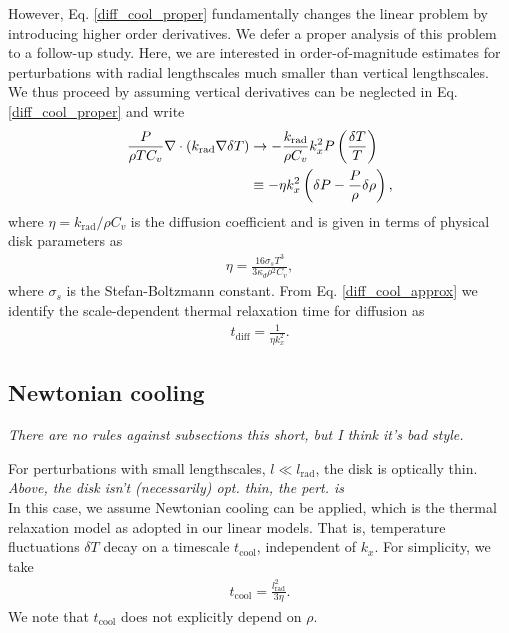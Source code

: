 However, Eq. \ref{diff_cool_proper} fundamentally changes the linear
problem by introducing higher order derivatives. We defer a proper
analysis of this problem to a follow-up study. Here, we are interested
in order-of-magnitude estimates for perturbations with radial
lengthscales much smaller than vertical lengthscales. We thus proceed 
by assuming vertical derivatives can be neglected in 
Eq. \ref{diff_cool_proper} and write  
\begin{align}\label{diff_cool_approx}
  \frac{P}{\rho T C_v} \nabla\cdot\left(k_\mathrm{rad}\nabla\delta
    T\right) &\to -\frac{k_\mathrm{rad}}{\rho
    C_v}k_x^2P\left(\frac{\delta T}{T}\right)\notag\\
  &\equiv -\eta k_x^2 \left(\delta P - \frac{P}{\rho}\delta\rho\right), 
\end{align}
 where $\eta=k_\mathrm{rad}/\rho C_v$ is
the diffusion coefficient and 
is given in terms of physical disk parameters as 
\begin{align}\label{eta_def}
  \eta = \frac{16\sigma_s T^3}{3\kappa_d\rho^2 C_v}, 
\end{align}
where $\sigma_s$ is the Stefan-Boltzmann constant. 
From Eq. \ref{diff_cool_approx} we identify the scale-dependent thermal relaxation
time for diffusion as 
\begin{align}\label{tc_diff_cool} 
  t_\mathrm{diff} = \frac{1}{\eta k_x^2}.%
\end{align}

\subsection{Newtonian cooling}\label{newton_cool}
\emph{There are no rules against subsections this short, but I think it's bad style.}

For perturbations with small lengthscales, $l\ll l_\mathrm{rad}$, 
the disk is optically thin.\\
\emph{Above, the disk isn't (necessarily) opt. thin, the pert. is} \\
 In this case, we assume 
Newtonian cooling can be applied, which is the thermal
relaxation model as adopted in our linear models. That is, temperature
fluctuations $\delta T$ decay on a timescale $t_\mathrm{cool}$,
independent of $k_x$. For simplicity, we take  
\begin{align}
  t_\mathrm{cool} = \frac{l_\mathrm{rad}^2}{3\eta}. 
\end{align}
We note that $t_\mathrm{cool}$ does not explicitly depend on $\rho$. 


